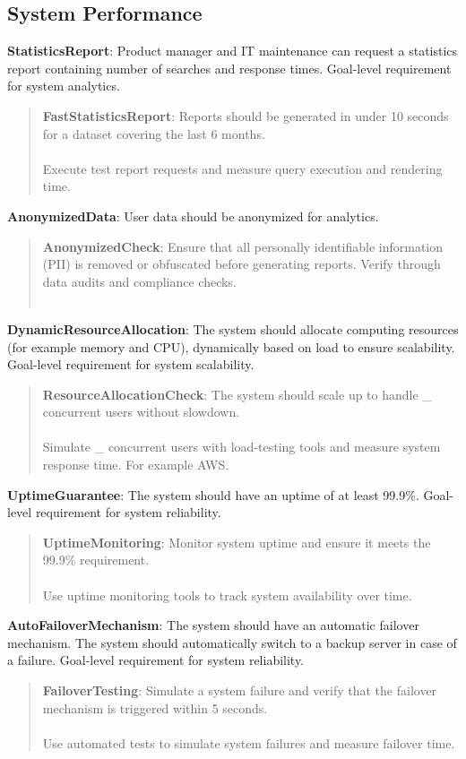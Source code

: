 \subsection{System Performance}
\textbf{StatisticsReport}: Product manager and IT maintenance can request a statistics report containing number of searches and response times. Goal-level requirement for system analytics.
\begin{quote}
    \textbf{FastStatisticsReport}: Reports should be generated in under 10 seconds for a dataset covering the last 6 months. \\ \\
    Execute test report requests and measure query execution and rendering time.
\end{quote}
\textbf{AnonymizedData}: User data should be anonymized for analytics. 
\begin{quote}
    \textbf{AnonymizedCheck}: Ensure that all personally identifiable information (PII) is removed or obfuscated before generating reports. Verify through data audits and compliance checks. \\ \\
\end{quote}
\textbf{DynamicResourceAllocation}: The system should allocate computing resources (for example memory and CPU), dynamically based on load to ensure scalability. Goal-level requirement for system scalability.
\begin{quote}
    \textbf{ResourceAllocationCheck}: The system should scale up to handle \_ concurrent users without slowdown. \\ \\
    Simulate \_ concurrent users with load-testing tools and measure system response time. For example AWS.
\end{quote}
\textbf{UptimeGuarantee}: The system should have an uptime of at least 99.9\%. Goal-level requirement for system reliability.
\begin{quote}
    \textbf{UptimeMonitoring}: Monitor system uptime and ensure it meets the 99.9\% requirement. \\ \\
    Use uptime monitoring tools to track system availability over time.
\end{quote}
\textbf{AutoFailoverMechanism}: The system should have an automatic failover mechanism. The system should automatically switch to a backup server in case of a failure. Goal-level requirement for system reliability.
\begin{quote}
    \textbf{FailoverTesting}: Simulate a system failure and verify that the failover mechanism is triggered within 5 seconds. \\ \\
    Use automated tests to simulate system failures and measure failover time.
\end{quote}
